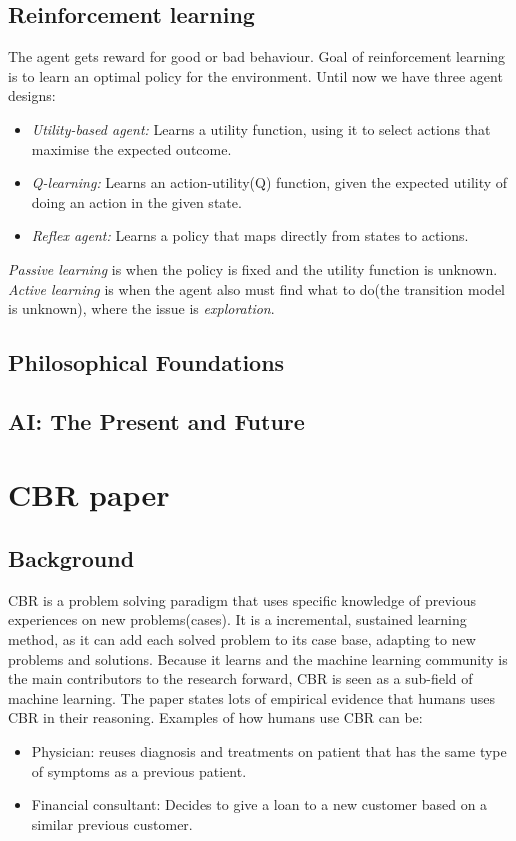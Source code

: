\documentclass[11pt, letterpaper]{report}
\numberwithin{equation}{section}
\begin{document}
\section{Reinforcement learning}
The agent gets reward for good or bad behaviour. Goal of reinforcement learning
is to learn an optimal policy for the environment. Until now we have three agent
designs:
\begin{itemize}
\item \emph{Utility-based agent:} Learns a utility function, using it to select
  actions that maximise the expected outcome.
\item \emph{Q-learning:} Learns an action-utility(Q) function, given the
  expected utility of doing an action in the given state.
\item \emph{Reflex agent:} Learns a policy that maps directly from states to actions.
\end{itemize}

\emph{Passive learning} is when the policy is fixed and the utility function is
unknown. \emph{Active learning} is when the agent also must find what to do(the
transition model is unknown), where the issue is \emph{exploration}.

\section{Philosophical Foundations}


\section{AI: The Present and Future}


\setcounter{section}{0}
\chapter{CBR paper}

\section{Background}
CBR is a problem solving paradigm that uses specific knowledge of previous
experiences on new problems(cases). It is a incremental, sustained learning
method, as it can add each solved problem to its case base, adapting to new
problems and solutions. Because it learns and
the machine learning community is the main contributors to the research forward,
CBR is seen as a sub-field of machine learning. The paper states lots
of empirical evidence that humans uses CBR in their reasoning. Examples of how
humans use CBR can be:
\begin{itemize}
\item{Physician:} reuses diagnosis and treatments on patient that has the same
  type of symptoms as a previous patient.
\item{Financial consultant:} Decides to give a loan to a new customer based on
    a similar previous customer.
\end{itemize}
\end{document}
